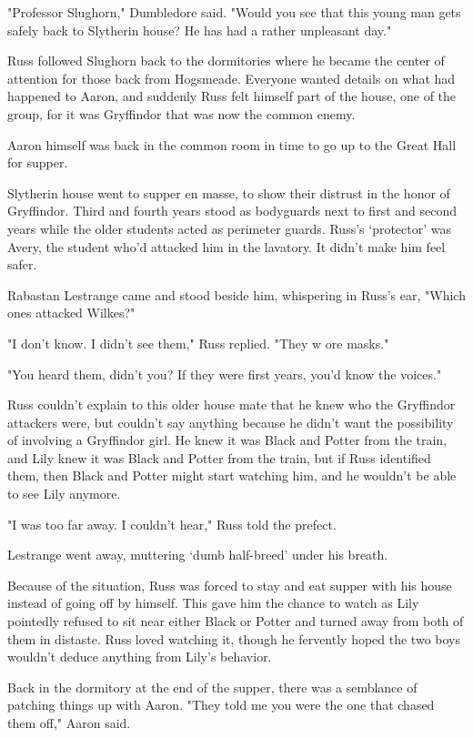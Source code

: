 "Professor Slughorn," Dumbledore said. "Would you see that this young man gets safely back to Slytherin house? He has had a rather unpleasant day."

Russ followed Slughorn back to the dormitories where he became the center of attention for those back from Hogsmeade. Everyone wanted details on what had happened to Aaron, and suddenly Russ felt himself part of the house, one of the group, for it was Gryffindor that was now the common enemy.

Aaron himself was back in the common room in time to go up to the Great Hall for supper.

Slytherin house went to supper en masse, to show their distrust in the honor of Gryffindor. Third and fourth years stood as bodyguards next to first and second years while the older students acted as perimeter guards. Russ's `protector' was Avery, the student who'd attacked him in the lavatory. It didn't make him feel safer.

Rabastan Lestrange came and stood beside him, whispering in Russ's ear, "Which ones attacked Wilkes?"

"I don't{\el} know. I didn't{\el} see them," Russ replied. "They w{\el} ore masks."

"You heard them, didn't you? If they were first years, you'd know the voices."

Russ couldn't explain to this older house mate that he knew who the Gryffindor attackers were, but couldn't say anything because he didn't want the possibility of involving a Gryffindor girl. He knew it was Black and Potter from the train, and Lily knew it was Black and Potter from the train, but if Russ identified them, then Black and Potter might start watching him, and he wouldn't be able to see Lily anymore.

"I was{\el} too far{\el} away. I couldn't{\el} hear," Russ told the prefect.

Lestrange went away, muttering `dumb half-breed' under his breath.

Because of the situation, Russ was forced to stay and eat supper with his house instead of going off by himself. This gave him the chance to watch as Lily pointedly refused to sit near either Black or Potter and turned away from both of them in distaste. Russ loved watching it, though he fervently hoped the two boys wouldn't deduce anything from Lily's behavior.

Back in the dormitory at the end of the supper, there was a semblance of patching things up with Aaron. "They told me you were the one that chased them off," Aaron said.


